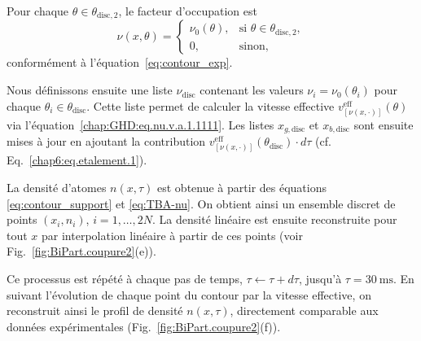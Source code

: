 Pour chaque \(\theta \in \theta_{\mathrm{disc},2}\), le facteur d’occupation est
\[
\nu(x,\theta) = 
\begin{cases}
\nu_0(\theta), & \text{si } \theta \in \theta_{\mathrm{disc},2}, \\
0, & \text{sinon},
\end{cases}
\]
conformément à l’équation~\eqref{eq:contour_exp}.

\medskip

Nous définissons ensuite une liste \(\nu_{\mathrm{disc}}\) contenant les valeurs \(\nu_i = \nu_0(\theta_i)\) pour chaque \(\theta_i \in \theta_{\mathrm{disc}}\).  
Cette liste permet de calculer la vitesse effective
\(
v^{\mathrm{eff}}_{[\nu(x,\cdot)]}(\theta)
\)
via l’équation~\eqref{chap:GHD:eq.nu.v.a.1.1111}.  
Les listes \(x_{g,\mathrm{disc}}\) et \(x_{b,\mathrm{disc}}\) sont ensuite mises à jour en ajoutant la contribution
\(
v^{\mathrm{eff}}_{[\nu(x,\cdot)]}(\theta_{\mathrm{disc}}) \cdot d\tau
\)
(cf. Eq.~\eqref{chap6:eq.etalement.1}).

\medskip

La densité d’atomes \(n(x,\tau)\) est obtenue à partir des équations \eqref{eq:contour_support} et \eqref{eq:TBA-nu}.  
On obtient ainsi un ensemble discret de points \((x_i,n_i)\), \(i=1,\dots,2N\).  
La densité linéaire est ensuite reconstruite pour tout \(x\) par interpolation linéaire à partir de ces points (voir Fig.~\ref{fig:BiPart.coupure2}(e)).

\medskip

Ce processus est répété à chaque pas de temps, \(\tau \leftarrow \tau + d\tau\), jusqu’à \(\tau = 30~\mathrm{ms}\).  
En suivant l’évolution de chaque point du contour par la vitesse effective, on reconstruit ainsi le profil de densité \(n(x,\tau)\), directement comparable aux données expérimentales (Fig.~\ref{fig:BiPart.coupure2}(f)).



